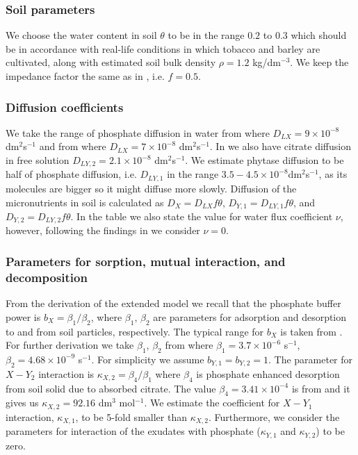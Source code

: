 \documentclass[11pt]{article}
\numberwithin{equation}{section}
\begin{document}
\subsubsection{Soil parameters}
We choose the water content in soil $\theta$ to be in the range $0.2$ to $0.3$ which should be in accordance with real-life conditions in which tobacco and barley are cultivated, along with estimated soil bulk density $\rho=1.2$ kg/dm$^{-3}$. We keep the impedance factor the same as in \cite{Ptashnyk-2011}, i.e. $f=0.5$.

\subsubsection{Diffusion coefficients}
We take the range of phosphate diffusion in water from \cite{Ptashnyk-2010} where $D_{LX} = 9 \times 10^{-8}$ dm$^2$s$^{-1}$ and from \cite{McKayFletcher-2019} where $D_{LX} = 7 \times 10^{-8}$ dm$^2$s$^{-1}$. In \cite{McKayFletcher-2019} we also have citrate diffusion in free solution $D_{LY,2} = 2.1 \times 10^{-8}$ dm$^2$s$^{-1}$. We estimate phytase diffusion to be half of phosphate diffusion, i.e. $D_{LY,1}$ in the range $3.5-4.5 \times 10^{-8}$dm$^2$s$^{-1}$, as its molecules are bigger so it might diffuse more slowly. Diffusion of the micronutrients in soil is calculated as $D_X = D_{LX}f\theta$, $D_{Y,1} = D_{LY,1}f\theta$, and $D_{Y,2} = D_{LY,2}f\theta$. In the table we also state the value for water flux coefficient $\nu$, however, following the findings in \cite{Ptashnyk-2011} we consider $\nu=0$. 

\subsubsection{Parameters for sorption, mutual interaction, and decomposition}
From the derivation of the extended model we recall that the phosphate buffer power is $b_X = \beta_1 / \beta_2$, where $\beta_1$, $\beta_2$ are parameters for adsorption and desorption to and from soil particles, respectively. The typical range for $b_X$ is taken from \cite{Ptashnyk-2010}. For further derivation we take $\beta_1$, $\beta_2$ from \cite{Ptashnyk-2010} where $\beta_1 = 3.7 \times 10^{-6}$ s$^{-1}$, $\beta_2 = 4.68 \times 10^{-9}$ s$^{-1}$. For simplicity we assume $b_{Y,1}=b_{Y,2} = 1$. The parameter for $X-Y_2$ interaction is $\kappa_{X,2} = \beta_4 / \beta_1$ where $\beta_4$ is phosphate enhanced desorption from soil solid due to absorbed citrate. The value $\beta_4 = 3.41 \times 10^{-4}$ is from \cite{McKayFletcher-2019} and it gives us $\kappa_{X,2} = 92.16$ dm$^3$ mol$^{-1}$. We estimate the coefficient for $X-Y_1$ interaction, $\kappa_{X,1}$, to be 5-fold smaller than $\kappa_{X,2}$. Furthermore, we consider the parameters for interaction of the exudates with phosphate ($\kappa_{Y,1}$ and $\kappa_{Y,2}$) to be zero. 
\end{document}
